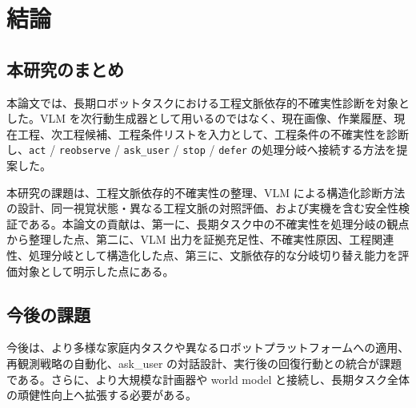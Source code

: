 \chapter{結論}

\section{本研究のまとめ}

本論文では、長期ロボットタスクにおける工程文脈依存的不確実性診断を対象とした。VLM を次行動生成器として用いるのではなく、現在画像、作業履歴、現在工程、次工程候補、工程条件リストを入力として、工程条件の不確実性を診断し、\texttt{act} / \texttt{reobserve} / \texttt{ask\_user} / \texttt{stop} / \texttt{defer} の処理分岐へ接続する方法を提案した。

本研究の課題は、工程文脈依存的不確実性の整理、VLM による構造化診断方法の設計、同一視覚状態・異なる工程文脈の対照評価、および実機を含む安全性検証である。本論文の貢献は、第一に、長期タスク中の不確実性を処理分岐の観点から整理した点、第二に、VLM 出力を証拠充足性、不確実性原因、工程関連性、処理分岐として構造化した点、第三に、文脈依存的な分岐切り替え能力を評価対象として明示した点にある。

\section{今後の課題}

今後は、より多様な家庭内タスクや異なるロボットプラットフォームへの適用、再観測戦略の自動化、ask\_user の対話設計、実行後の回復行動との統合が課題である。さらに、より大規模な計画器や world model と接続し、長期タスク全体の頑健性向上へ拡張する必要がある。
